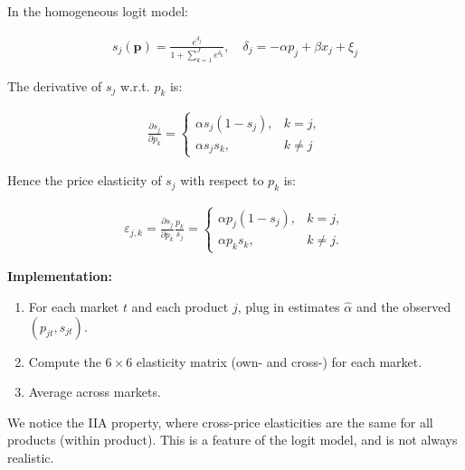 In the homogeneous logit model:

\begin{align*}
s_j(\mathbf{p})=\frac{e^{\delta_j}}{1+\sum_{k=1}^J e^{\delta_k}}, \quad \delta_j=-\alpha p_j+\beta x_j+\xi_j
\end{align*}


The derivative of $s_j$ w.r.t. $p_k$ is:

\begin{align*}
\frac{\partial s_j}{\partial p_k}= \begin{cases}\alpha s_j\left(1-s_j\right), & k=j, \\ {\alpha s_j s_k,} & k \neq j\end{cases}
\end{align*}


Hence the price elasticity of $s_j$ with respect to $p_k$ is:

\begin{align*}
\varepsilon_{j, k}=\frac{\partial s_j}{\partial p_k} \frac{p_k}{s_j}= \begin{cases}\alpha p_j\left(1-s_j\right), & k=j, \\ { \alpha p_k s_k,} & k \neq j .\end{cases}
\end{align*}


\textbf{Implementation:}
\begin{enumerate}
\item For each market $t$ and each product $j$, plug in estimates $\hat{\alpha}$ and the observed $\left(p_{j t}, s_{j t}\right)$.
\item Compute the $6 \times 6$ elasticity matrix (own- and cross-) for each market.
\item Average across markets.
\end{enumerate}

We notice the IIA property, where cross-price elasticities are the same for all products (within product). This is a feature of the logit model, and is not always realistic.




